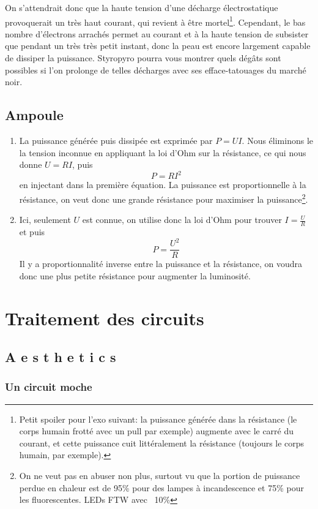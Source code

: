 \documentclass{article}
\begin{document}
\begin{enumerate}
    On s'attendrait donc que la haute tension d'une décharge électrostatique provoquerait un très haut courant, qui revient à être mortel\footnote{Petit spoiler pour l'exo suivant: la puissance générée dans la résistance (le corps humain frotté avec un pull par exemple) augmente avec le carré du courant, et cette puissance cuit littéralement la résistance (toujours le corps humain, par exemple).}. Cependant, le bas nombre d'électrons arrachés permet au courant et à la haute tension de subsister que pendant un très très petit instant, donc la peau est encore largement capable de dissiper la puissance. Styropyro pourra vous montrer quels dégâts sont possibles si l'on prolonge de telles décharges avec ses efface-tatouages du marché noir.
\end{enumerate}

\subsection{Ampoule}
\begin{enumerate}
    \item La puissance générée puis dissipée est exprimée par $P=UI$. Nous éliminons le la tension inconnue en appliquant la loi d'Ohm sur la résistance, ce qui nous donne $U=RI$, puis \[P=RI^2\] en injectant dans la première équation. La puissance est proportionnelle à la résistance, on veut donc une grande résistance pour maximiser la puissance\footnote{On ne veut pas en abuser non plus, surtout vu que la portion de puissance perdue en chaleur est de 95\% pour des lampes à incandescence et 75\% pour les fluorescentes. LEDs FTW avec ~10\%}.
    \item Ici, seulement $U$ est connue, on utilise donc la loi d'Ohm pour trouver $I=\frac{U}{R}$ et puis \[P=\frac{U^2}{R}\] Il y a proportionnalité inverse entre la puissance et la résistance, on voudra donc une plus petite résistance pour augmenter la luminosité.
\end{enumerate}

\section{Traitement des circuits}

\subsection{A e s t h e t i c s}

\subsubsection{Un circuit moche}
\label{sexo:circuit_moche}
\end{document}
